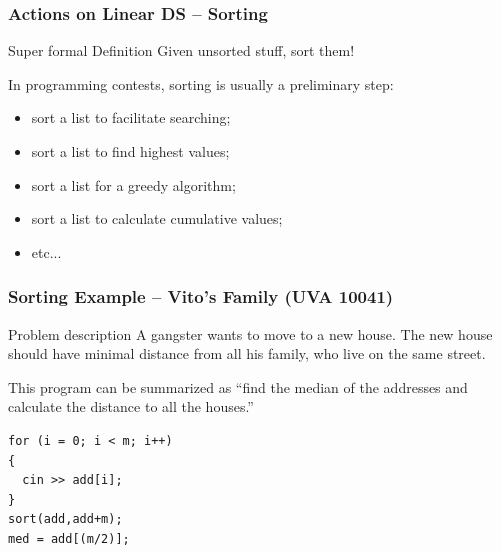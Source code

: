 \documentclass{beamer}
\begin{document}
\begin{frame}
  \frametitle{Actions on Linear DS -- Sorting}
  \begin{block}{Super formal Definition}
    \hfill Given unsorted stuff, sort them!
  \end{block}

  \bigskip

  In programming contests, sorting is usually a preliminary step:
  \begin{itemize}
  \item sort a list to facilitate searching;
  \item sort a list to find highest values;
  \item sort a list for a greedy algorithm;
  \item sort a list to calculate cumulative values;
  \item etc...
  \end{itemize}
\end{frame}

\begin{frame}
  \frametitle{Sorting Example -- Vito's Family (UVA 10041)}
  
  \begin{exampleblock}{Problem description}
    A gangster wants to move to a new house. The new house should have
    minimal distance from all his family, who live on the same street.
  \end{exampleblock}

  \medskip

  This program can be summarized as ``find the median of the addresses
  and calculate the distance to all the houses.''

  \medskip

  \begin{block}{}
    {\small
\begin{verbatim}
for (i = 0; i < m; i++)
{
  cin >> add[i];
} 
sort(add,add+m);
med = add[(m/2)];
\end{verbatim}}
  \end{block}
\end{frame}


%  
%
\end{document}

